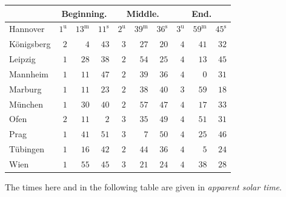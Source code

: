 \begin{center}\small\setlength{\tabcolsep}{3pt}
\begin{tabular}{l|rrr|rrr|rrr}
  &  \multicolumn{3}{c|}{Beginning.}  &  \multicolumn{3}{c|}{Middle.}  &  \multicolumn{3}{c}{End.}  \\
\hline
 Hannover  &  $1^{\mathrm u}$  &  $13^{\mathrm m}$  &  $11^{\mathrm s}$  &  $2^{\mathrm u}$  &  $39^{\mathrm m}$  &  $36^{\mathrm s}$  &  $3^{\mathrm u}$  &  $59^{\mathrm m}$  &  $45^{\mathrm s}$ \\
 Königsberg  &  $2$  &  $4$  &  $43$  &  $3$  &  $27$  &  $20$  &  $4$  &  $41$  &  $32$ \\
 Leipzig  &  $1$  &  $28$  &  $38$  &  $2$  &  $54$  &  $25$  &  $4$  &  $13$  &  $45$ \\
 Mannheim  &  $1$  &  $11$  &  $47$  &  $2$  &  $39$  &  $36$  &  $4$  &  $0$  &  $31$ \\
 Marburg  &  $1$  &  $11$  &  $23$  &  $2$  &  $38$  &  $40$  &  $3$  &  $59$  &  $18$ \\
 München  &  $1$  &  $30$  &  $40$  &  $2$  &  $57$  &  $47$  &  $4$  &  $17$  &  $33$ \\
 Ofen  &  $2$  &  $11$  &  $2$  &  $3$  &  $35$  &  $49$  &  $4$  &  $51$  &  $31$ \\
 Prag  &  $1$  &  $41$  &  $51$  &  $3$  &  $7$  &  $50$  &  $4$  &  $25$  &  $46$ \\
 Tübingen  &  $1$  &  $16$  &  $42$  &  $2$  &  $44$  &  $36$  &  $4$  &  $5$  &  $24$ \\
 Wien  &  $1$  &  $55$  &  $45$  &  $3$  &  $21$  &  $24$  &  $4$  &  $38$  &  $28$ \\
\end{tabular}
\end{center}

The times here and in the following table are given in \emph{apparent solar time}.

